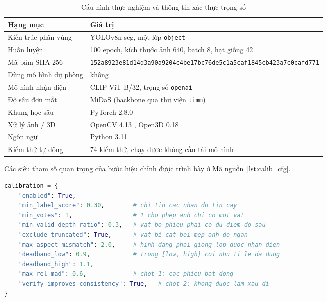 \begin{table}[H]
\centering
\caption{Cấu hình thực nghiệm và thông tin xác thực trọng số}
\label{tab:thiet_lap}
\small
\begin{tabularx}{\textwidth}{l X}
\toprule
\textbf{Hạng mục} & \textbf{Giá trị} \\
\midrule
Kiến trúc phân vùng & YOLOv8n-seg, một lớp \texttt{object} \\
Huấn luyện          & 100 epoch, kích thước ảnh 640, batch 8, hạt giống 42 \\
Mã băm SHA-256      & {\footnotesize\texttt{152a8923e81d14d3a90a9204c4be17bc76de5c1a5caf1845cb423a7c0cafd771}} \\
Dùng mô hình dự phòng & không \\
Mô hình nhận diện   & CLIP ViT-B/32, trọng số \texttt{openai} \\
Độ sâu đơn mắt      & MiDaS (backbone qua thư viện \texttt{timm}) \\
Khung học sâu       & PyTorch 2.8.0 \cite{paszke2019pytorch} \\
Xử lý ảnh / 3D      & OpenCV 4.13 \cite{bradski2000opencv}, Open3D 0.18 \cite{zhou2018open3d} \\
Ngôn ngữ            & Python 3.11 \\
Kiểm thử tự động    & 74 kiểm thử, chạy được không cần tải mô hình \\
\bottomrule
\end{tabularx}
\end{table}

Các siêu tham số quan trọng của bước hiệu chỉnh được trình bày ở Mã nguồn~\ref{lst:calib_cfg}.

\begin{lstlisting}[language=Python,caption={Cấu hình bước hiệu chỉnh tỉ lệ},label={lst:calib_cfg}]
calibration = {
    "enabled": True,
    "min_label_score": 0.30,        # chi tin cac nhan du tin cay
    "min_votes": 1,                 # 1 cho phep anh chi co mot vat
    "min_valid_depth_ratio": 0.3,   # vat bo phieu phai co du diem do sau
    "exclude_truncated": True,      # vat bi cat boi mep anh do ngan
    "max_aspect_mismatch": 2.0,     # hinh dang phai giong lop duoc nhan dien
    "deadband_low": 0.9,            # trong [low, high] coi nhu ti le da dung
    "deadband_high": 1.1,
    "max_rel_mad": 0.6,             # chot 1: cac phieu bat dong
    "verify_improves_consistency": True,   # chot 2: khong duoc lam xau di
}
\end{lstlisting}
